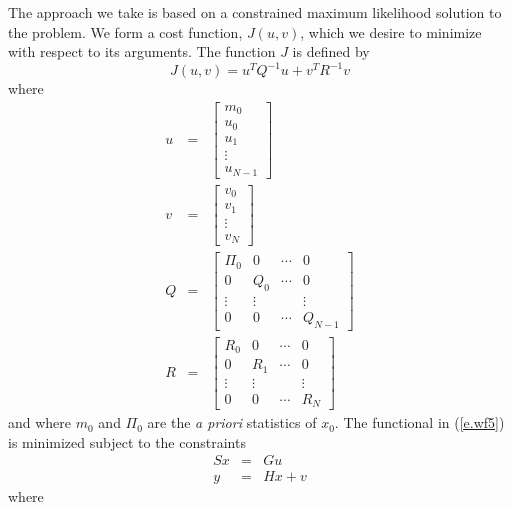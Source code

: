 	The approach we take is based on a constrained
maximum likelihood solution to the problem. We form a cost 
function, $J(u,v)$, which we desire to minimize
with respect to its arguments.  The function $J$ is
defined by
%
\begin{equation}
J(u,v)=u^TQ^{-1}u+v^TR^{-1}v
\label{e.wf5}
\end{equation}
%
where 
%
\begin{eqnarray}
u&=&\left[\begin{array}{c}
m_0\\
u_0\\
u_1\\
\vdots\\
u_{N-1}\end{array}\right]\nonumber\\
v&=&\left[\begin{array}{c}
v_0\\
v_1\\
\vdots\\
v_N\end{array}\right]\nonumber\\
Q&=&\left[\begin{array}{cccc}
\Pi_0&0&\cdots&0\\
0&Q_0&\cdots&0\\
\vdots&\vdots&&\vdots\\
0&0&\cdots&Q_{N-1}\end{array}\right]\nonumber\\
R&=&\left[\begin{array}{cccc}
R_0&0&\cdots&0\\
0&R_1&\cdots&0\\
\vdots&\vdots&&\vdots\\
0&0&\cdots&R_N\end{array}\right]
\label{e.wf5a}
\end{eqnarray}
%
and where $m_0$ and $\Pi_0$ are the {\em a priori} statistics of $x_0$.
The functional in (\ref{e.wf5})
is minimized subject to the constraints
%
\begin{eqnarray}
Sx&=&Gu\nonumber\\
y&=&Hx+v
\label{e.wf6}
\end{eqnarray}
%
where 
%
